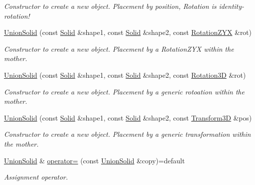\begin{DoxyCompactItemize}
\begin{DoxyCompactList}\small\item\em Constructor to create a new object. Placement by position, Rotation is identity-\/rotation! \end{DoxyCompactList}\item 
\hyperlink{class_d_d4hep_1_1_geometry_1_1_union_solid_a7756c7183422cf3f33cee33b161389e0}{Union\+Solid} (const \hyperlink{namespace_d_d4hep_1_1_geometry_a83de90a8dcc7378ba47d54ef9a6a687b}{Solid} \&shape1, const \hyperlink{namespace_d_d4hep_1_1_geometry_a83de90a8dcc7378ba47d54ef9a6a687b}{Solid} \&shape2, const \hyperlink{namespace_d_d4hep_1_1_geometry_a24667b2b9c3cec3d5239828db4d52189}{Rotation\+Z\+YX} \&rot)
\begin{DoxyCompactList}\small\item\em Constructor to create a new object. Placement by a Rotation\+Z\+YX within the mother. \end{DoxyCompactList}\item 
\hyperlink{class_d_d4hep_1_1_geometry_1_1_union_solid_ab24f18730c80761ea9acb96e802242c3}{Union\+Solid} (const \hyperlink{namespace_d_d4hep_1_1_geometry_a83de90a8dcc7378ba47d54ef9a6a687b}{Solid} \&shape1, const \hyperlink{namespace_d_d4hep_1_1_geometry_a83de90a8dcc7378ba47d54ef9a6a687b}{Solid} \&shape2, const \hyperlink{namespace_d_d4hep_1_1_geometry_a022fecb763315fa2bf39cbb648944a0e}{Rotation3D} \&rot)
\begin{DoxyCompactList}\small\item\em Constructor to create a new object. Placement by a generic rotoation within the mother. \end{DoxyCompactList}\item 
\hyperlink{class_d_d4hep_1_1_geometry_1_1_union_solid_ad75ca3619515031cb82d0474bd8c6fc2}{Union\+Solid} (const \hyperlink{namespace_d_d4hep_1_1_geometry_a83de90a8dcc7378ba47d54ef9a6a687b}{Solid} \&shape1, const \hyperlink{namespace_d_d4hep_1_1_geometry_a83de90a8dcc7378ba47d54ef9a6a687b}{Solid} \&shape2, const \hyperlink{namespace_d_d4hep_1_1_geometry_aeb4c0356d12fd7be49a0aae50514e64b}{Transform3D} \&pos)
\begin{DoxyCompactList}\small\item\em Constructor to create a new object. Placement by a generic transformation within the mother. \end{DoxyCompactList}\item 
\hyperlink{class_d_d4hep_1_1_geometry_1_1_union_solid}{Union\+Solid} \& \hyperlink{class_d_d4hep_1_1_geometry_1_1_union_solid_a661d210303700b108af32bcbf1252a67}{operator=} (const \hyperlink{class_d_d4hep_1_1_geometry_1_1_union_solid}{Union\+Solid} \&copy)=default
\begin{DoxyCompactList}\small\item\em Assignment operator. \end{DoxyCompactList}\end{DoxyCompactItemize}
